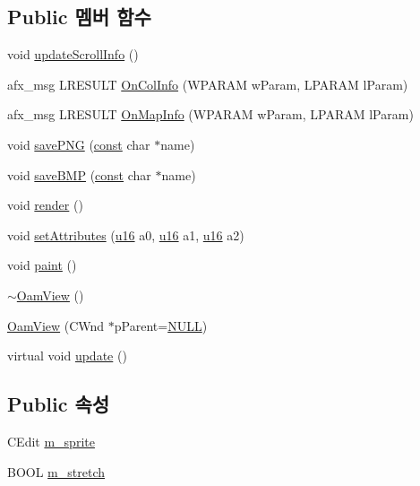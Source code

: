 \subsection*{Public 멤버 함수}
\begin{DoxyCompactItemize}
\item 
void \mbox{\hyperlink{class_oam_view_ae51c17aebff73f557073546febb45eba}{update\+Scroll\+Info}} ()
\item 
afx\+\_\+msg L\+R\+E\+S\+U\+LT \mbox{\hyperlink{class_oam_view_a5b910cf923020f054165c52c01d0181f}{On\+Col\+Info}} (W\+P\+A\+R\+AM w\+Param, L\+P\+A\+R\+AM l\+Param)
\item 
afx\+\_\+msg L\+R\+E\+S\+U\+LT \mbox{\hyperlink{class_oam_view_a139d46b95c3f0a9198e7d4fc134f88c2}{On\+Map\+Info}} (W\+P\+A\+R\+AM w\+Param, L\+P\+A\+R\+AM l\+Param)
\item 
void \mbox{\hyperlink{class_oam_view_ac5531c409060efd6ef1654ae908db4ef}{save\+P\+NG}} (\mbox{\hyperlink{getopt1_8c_a2c212835823e3c54a8ab6d95c652660e}{const}} char $\ast$name)
\item 
void \mbox{\hyperlink{class_oam_view_aa760ae67c006a164258c21a127e1e847}{save\+B\+MP}} (\mbox{\hyperlink{getopt1_8c_a2c212835823e3c54a8ab6d95c652660e}{const}} char $\ast$name)
\item 
void \mbox{\hyperlink{class_oam_view_a391d8ee2931b2927e936c7100e676451}{render}} ()
\item 
void \mbox{\hyperlink{class_oam_view_aafceb25b05d3ff2eacffa1a53308ee1d}{set\+Attributes}} (\mbox{\hyperlink{_system_8h_a9e6c91d77e24643b888dbd1a1a590054}{u16}} a0, \mbox{\hyperlink{_system_8h_a9e6c91d77e24643b888dbd1a1a590054}{u16}} a1, \mbox{\hyperlink{_system_8h_a9e6c91d77e24643b888dbd1a1a590054}{u16}} a2)
\item 
void \mbox{\hyperlink{class_oam_view_af9092e04b559ef87670e18dd42c45669}{paint}} ()
\item 
\mbox{\hyperlink{class_oam_view_a0458669eaec2de4e68b492033625be39}{$\sim$\+Oam\+View}} ()
\item 
\mbox{\hyperlink{class_oam_view_a58028e15d10221a62f25799321516416}{Oam\+View}} (C\+Wnd $\ast$p\+Parent=\mbox{\hyperlink{_system_8h_a070d2ce7b6bb7e5c05602aa8c308d0c4}{N\+U\+LL}})
\item 
virtual void \mbox{\hyperlink{class_oam_view_a9a54cb2672c3302524a00b744d09b645}{update}} ()
\end{DoxyCompactItemize}
\subsection*{Public 속성}
\begin{DoxyCompactItemize}
\item 
C\+Edit \mbox{\hyperlink{class_oam_view_a808b936a1493d14a2a4bf27f3030af14}{m\+\_\+sprite}}
\item 
B\+O\+OL \mbox{\hyperlink{class_oam_view_a0eeb8a1eeda8d53816c2696d70d61da4}{m\+\_\+stretch}}
\end{DoxyCompactItemize}
